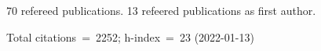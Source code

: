 70 refereed publications. 13 refeered publications as first author.

Total citations~=~2252; h-index~=~23 (2022-01-13)